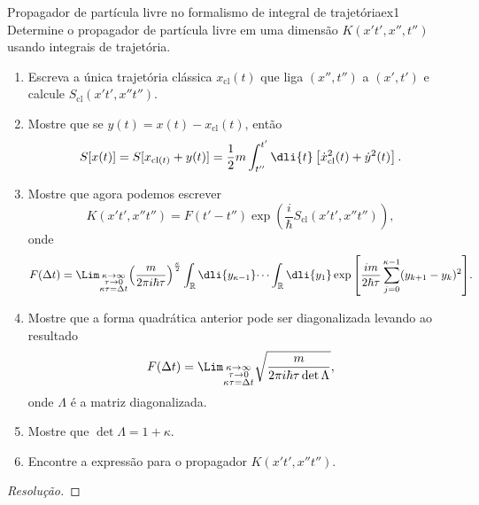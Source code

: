 \begin{exercício}{Propagador de partícula livre no formalismo de integral de trajetória}{ex1}
    Determine o propagador de partícula livre em uma dimensão \(K(x't', x'',t'')\) usando integrais de trajetória.
    \begin{enumerate}[label=(\alph*)]
       \item Escreva a única trajetória clássica \(x_{\mathrm{cl}}(t)\) que liga \((x'',t'')\) a \((x',t')\) e calcule \(S_{\mathrm{cl}}(x't',x''t'').\)
       \item Mostre que se \(y(t) = x(t) - x_{\mathrm{cl}}(t)\), então
          \begin{equation*}
             S[x(t)] = S[x_{\mathrm{cl}(t)} + y(t)] = \frac12m\int_{t''}^{t'} \dli{t} \left[\dot{x}_{\mathrm{cl}}^2(t) + \dot{y}^2(t)\right].
          \end{equation*}
       \item Mostre que agora podemos escrever
          \begin{equation*}
             K(x't', x''t'') = F(t' - t'') \exp\left(\frac{i}{\hbar} S_{\mathrm{cl}}(x't', x''t'')\right),
          \end{equation*}
          onde
          \begin{equation*}
             F(\Delta t) = \Lim_{\substack{\kappa \to \infty\\ \tau \to 0\\ \kappa \tau = \Delta t}}{\left(\frac{m}{2\pi i \hbar \tau}\right)^{\frac\kappa2}\int_{\mathbb{R}} \dli{y_{\kappa - 1}} \dots \int_{\mathbb{R}} \dli{y_1} \exp\left[\frac{im}{2 \hbar \tau} \sum_{j = 0}^{\kappa - 1}(y_{k+1} - y_k)^2\right]}.
          \end{equation*}
       \item Mostre que a forma quadrática anterior pode ser diagonalizada levando ao resultado
          \begin{equation*}
             F(\Delta t) = \Lim_{\substack{\kappa \to \infty\\ \tau \to 0\\ \kappa \tau = \Delta t}} \sqrt{\frac{m}{2\pi i \hbar \tau \det \Lambda}},
          \end{equation*}
          onde \(\Lambda\) é a matriz diagonalizada.
       \item Mostre que \(\det \Lambda = 1 + \kappa.\)
       \item Encontre a expressão para o propagador \(K(x't', x''t'').\)
    \end{enumerate}
\end{exercício}
\begin{proof}[Resolução]
    
\end{proof}
